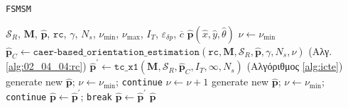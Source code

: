 \begin{algorithm}
  \caption{\texttt{FSMSM}}
  \label{alg:algorithm_fsmsm}
  \begin{spacing}{1.5}
  \begin{algorithmic}[1]
    \REQUIRE $\mathcal{S}_R$, $\bm{M}$, $\hat{\bm{p}}$, $\texttt{rc}$,  $\gamma$, $N_s$, $\nu_{\min}$, $\nu_{\max}$, $I_T$, $\varepsilon_{\delta p}$, $\overline{c}$
    \ENSURE $\hat{\bm{p}}(\hat{x}, \hat{y}, \hat{\theta})$
    \STATE $\nu \leftarrow \nu_{\min}$
    \WHILE {$\nu \leq \nu_{\max}$}
      \STATE $\hat{\bm{p}}_C \leftarrow \texttt{caer-based\_orientation\_estimation}(\texttt{rc}, \bm{M}, \mathcal{S}_R, \hat{\bm{p}}, \gamma, N_s, \nu)$ \hfill (Αλγ. \ref{alg:02_04_04:rc})
      \STATE $\hat{\bm{p}}^{\prime} \leftarrow \texttt{tc\_x1}(\bm{M}, \mathcal{S}_R, \hat{\bm{p}}_C, I_T, \infty, N_s)$  \hfill (Αλγόριθμος \ref{alg:icte})
        \STATE generate new $\hat{\bm{p}}$; $\nu \leftarrow \nu_{\min}$; \texttt{continue}
      \ENDIF {}
        \STATE $\nu \leftarrow \nu + 1$
      \ENDIF {}
        \label{alg:fsmsm_termination_criterion_start}
          \STATE generate new $\hat{\bm{p}}$; $\nu \leftarrow \nu_{\min}$; \texttt{continue}
        \ELSE
          \STATE $\hat{\bm{p}} \leftarrow \hat{\bm{p}}^{\prime}$; \texttt{break}
        \ENDIF
      \ENDIF {} \label{alg:fsmsm_termination_criterion_end}
      \STATE $\hat{\bm{p}} \leftarrow \hat{\bm{p}}^{\prime}$
    \ENDWHILE
    \RETURN $\hat{\bm{p}}$
  \end{algorithmic}
  \end{spacing}
\end{algorithm}
